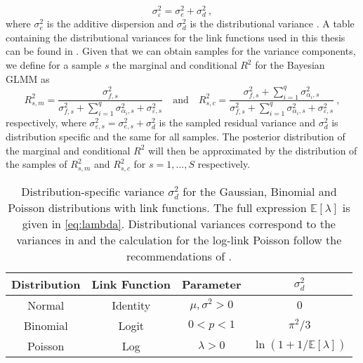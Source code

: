 \begin{equation}
    \sigma_{\varepsilon}^2 = \sigma^2_e + \sigma^2_d \ ,
\end{equation}
where $\sigma^2_e$ is the additive dispersion and $\sigma^2_d$ is the distributional variance \citep{nakagawa2013general}. A table containing the distributional variances for the link functions used in this thesis can be found in . Given that we can obtain samples for the variance components, we define for a sample $s$ the marginal and conditional $R^2$ for the Bayesian GLMM as
\begin{equation}
    \label{eq:R2_Bayes_GLMM}
    R^2_{s, m} = \frac{\sigma_{f, s}^2}{\sigma_{f, s}^2 + \sum_{i=1}^q \sigma_{\alpha_i, s}^2 + \sigma_{\varepsilon, s}^2} \quad \text{and} \quad R^2_{s, c} = \frac{\sigma_{f, s}^2 + \sum_{i=1}^q \sigma_{\alpha_i, s}^2}{\sigma_{f, s}^2 + \sum_{i=1}^q \sigma_{\alpha_i, s}^2 + \sigma_{\varepsilon, s}^2} \ ,
\end{equation}
respectively, where $\sigma_{\varepsilon, s}^2 = \sigma^2_{e, s} + \sigma^2_d$ is the sampled residual variance and $\sigma^2_d$ is distribution specific and the same for all samples. The posterior distribution of the marginal and conditional $R^2$ will then be approximated by the distribution of the samples of $R^2_{s, m}$ and $R^2_{s, c}$ for $s=1, ..., S$ respectively.

\begin{table}[ht]
    \centering
    \begin{tabular}{|c|c|c|c|}
    \hline
    \textbf{Distribution} &  \textbf{Link Function} & \textbf{Parameter} & \(\sigma^2_d\) \\
    \hline
    Normal & Identity & $\mu, \sigma^2 > 0$ & $0$ \\
    \hline
    Binomial & Logit & $0<p<1$ & \(\pi^2/3\) \\
    \hline
    Poisson & Log & $\lambda>0$ & $\ln(1 + 1/\mathbb{E}[\lambda])$ \\%
    \hline
    \end{tabular}
    \caption[Distribution-specific variance \(\sigma^2_d\) for the Gaussian, Binomial and Poisson distributions]{Distribution-specific variance \(\sigma^2_d\) for the Gaussian, Binomial and Poisson distributions with link functions. The full expression $\mathbb{E}[\lambda]$ is given in \eqref{eq:lambda}. Distributional variances correspond to the variances in \citet{nakagawa2013general} and the calculation for the log-link Poisson follow the recommendations of \citet{nakagawa2017}.}
    \label{table:1}
\end{table}


